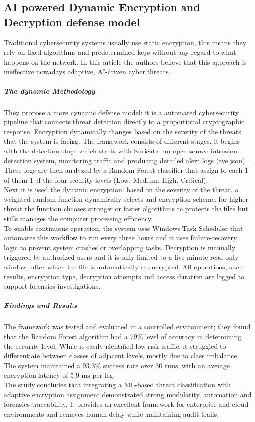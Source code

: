 \subsection{AI powered Dynamic Encryption and Decryption defense model}
Traditional cybersecurity systems usually use static encryption, this means they rely on fixed algorithms and predetermined keys without any regard to what happens on the network. 
In this article \cite{AIpoweredDynamicEncr} the authors believe that this approach is ineffective nowadays adaptive, AI-driven cyber threats.
\subparagraph{The dynamic Methodology} They propose a more dynamic defense model: it is a automated cybersecurity pipeline that connects threat detection directly to a proportional cryptographic response. Encryption dynamically changes based on the severity of the threats that the system is facing.
The framework consists of different stages, it begins with the detection stage which starts with Suricata, an open source intrusion detection system, monitoring traffic and producing detailed alert logs (eve.json). These logs are then analyzed by a Random Forest classifier that assign to each 1 of them 1 of the four security levels (Low, Medium, High, Critical).
\\Next it is used the dynamic encryption: based on the severity of the threat, a weighted random function dynamically selects and encryption scheme, for higher threat the function chooses stronger or faster algorithms to protects the files but stills manages the computer processing efficiency.
\\To enable continuous operation, the system uses Windows Task Scheduler that automates this workflow to run every three hours and it uses failure-recovery logic to prevent system crashes or overlapping tasks.
Decryption is manually triggered by authorized users and it is only limited to a five-minute read only window, after which the file is automatically re-encrypted. All operations, such results, encryption type, decryption attempts and access duration are logged to support forensics investigations.
\subparagraph{Findings and Results} The framework was tested and evaluated in a controlled environment; they found that the Random Forest algorithm had a 79\% level of accuracy in determining the security level. While it easily identified low risk traffic, it struggled to differentiate between classes of adjacent levels, mostly due to class imbalance. 
The system maintained a 93.3\% success rate over 30 runs, with an average encryption latency of 5-9 ms per log.
\\The study concludes that integrating a ML-based threat classification with adaptive encryption assignment demonstrated strong modularity, automation and forensics traceability. It provides an excellent framework for enterprise and cloud environments and removes human delay while maintaining audit trails.
